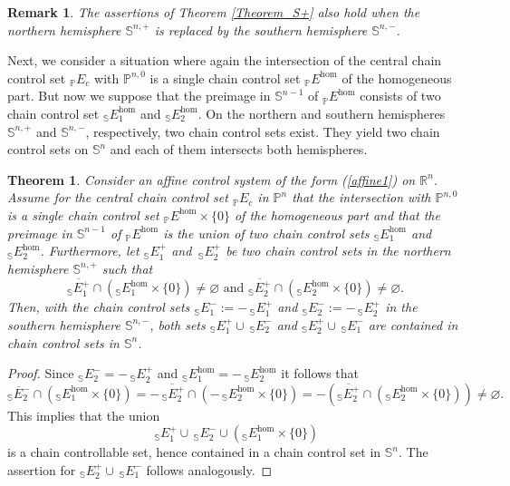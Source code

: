 \documentclass[preprint,12pt]{elsarticle}
\newtheorem{remark}{Remark}
\newtheorem{theorem}{Theorem}
\begin{document}
\begin{remark}
The assertions of Theorem \ref{Theorem_S+} also hold when the northern
hemisphere $\mathbb{S}^{n,+}$ is replaced by the southern hemisphere
$\mathbb{S}^{n,-}$.
\end{remark}

Next, we consider a situation where again the intersection of the central
chain control set $_{\mathbb{P}}E_{c}$ with $\mathbb{P}^{n,0}$ is a single
chain control set $_{\mathbb{P}}E^{\hom}$ of the homogeneous part. But now we
suppose that the preimage in $\mathbb{S}^{n-1}$ of $_{\mathbb{P}}E^{\hom}$
consists of two chain control set $_{\mathbb{S}}E_{1}^{\hom}$ and
$_{\mathbb{S}}E_{2}^{\hom}$. On the northern and southern hemispheres
$\mathbb{S}^{n,+}$ and $\mathbb{S}^{n,-}$, respectively, two chain control
sets exist. They yield two chain control sets on $\mathbb{S}^{n}$ and each of
them intersects both hemispheres.

\begin{theorem}
\label{Theorem_union}Consider an affine control system of the form
(\ref{affine1}) on $\mathbb{R}^{n}$. Assume for the central chain control set
$_{\mathbb{P}}E_{c}$ in $\mathbb{P}^{n}$ that the intersection with
$\mathbb{P}^{n,0}$ is a single chain control set $_{\mathbb{P}}E^{\hom}%
\times\{0\}$ of the homogeneous part and that the preimage in $\mathbb{S}%
^{n-1}$ of $_{\mathbb{P}}E^{\hom}$ is the union of two chain control sets
$_{\mathbb{S}}E_{1}^{\hom}$ and $_{\mathbb{S}}E_{2}^{\hom}$. Furthermore, let
$_{\mathbb{S}}E_{1}^{+}$ and $\,_{\mathbb{S}}E_{2}^{+}$ be two chain control
sets in the northern hemisphere $\mathbb{S}^{n,+}$ such that%
\[
\overline{_{\mathbb{S}}E_{1}^{+}}\cap\left(  _{\mathbb{S}}E_{1}^{\hom}%
\times\{0\}\right)  \not =\varnothing\text{ and }\overline{_{\mathbb{S}}%
E_{2}^{+}}\cap\left(  _{\mathbb{S}}E_{2}^{\hom}\times\{0\}\right)
\not =\varnothing.
\]
Then, with the chain control sets $_{\mathbb{S}}E_{1}^{-}:=-\,_{\mathbb{S}%
}E_{1}^{+}$ and $_{\mathbb{S}}E_{2}^{-}:=-\,_{\mathbb{S}}E_{2}^{+}$ in the
southern hemisphere $\mathbb{S}^{n,-}$, both sets $_{\mathbb{S}}E_{1}^{+}%
\cup\,_{\mathbb{S}}E_{2}^{-}$ and $_{\mathbb{S}}E_{2}^{+}\cup\,_{\mathbb{S}%
}E_{1}^{-}$ are contained in chain control sets in $\mathbb{S}^{n}$.
\end{theorem}

\begin{proof}
Since $_{\mathbb{S}}E_{2}^{-}=-\,_{\mathbb{S}}E_{2}^{+}$ and $_{\mathbb{S}%
}E_{1}^{\hom}=-\,_{\mathbb{S}}E_{2}^{\hom}$ it follows that%
\[
\overline{_{\mathbb{S}}E_{2}^{-}}\cap\left(  _{\mathbb{S}}E_{1}^{\hom}%
\times\{0\}\right)  =-\overline{\,_{\mathbb{S}}E_{2}^{+}}\cap\left(
-\,_{\mathbb{S}}E_{2}^{\hom}\times\{0\}\right)  =-\left(  \overline
{_{\mathbb{S}}E_{2}^{+}}\cap\left(  _{\mathbb{S}}E_{2}^{\hom}\times
\{0\}\right)  \right)  \not =\varnothing.
\]
This implies that the union
\[
\,_{\mathbb{S}}E_{1}^{+}\cup\,_{\mathbb{S}}E_{2}^{-}\cup\left(  _{\mathbb{S}%
}E_{1}^{\hom}\times\{0\}\right)
\]
is a chain controllable set, hence contained in a chain control set in
$\mathbb{S}^{n}$. The assertion for $_{\mathbb{S}}E_{2}^{+}\cup\,_{\mathbb{S}%
}E_{1}^{-}$ follows analogously.
\end{proof}
\end{document}
